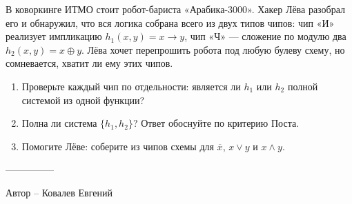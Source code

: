 \question
В коворкинге ИТМО стоит робот-бариста «Арабика-3000». Хакер Лёва разобрал его и обнаружил, что вся логика собрана всего из двух типов чипов: чип «И» реализует импликацию $h_1(x, y) = x \to y$, чип «Ч» — сложение по модулю два $h_2(x, y) = x \oplus y$. Лёва хочет перепрошить робота под любую булеву схему, но сомневается, хватит ли ему этих чипов.

\begin{enumerate}
    \item Проверьте каждый чип по отдельности: является ли $h_1$ или $h_2$ полной системой из одной функции?
    \item Полна ли система $\{h_1, h_2\}$? Ответ обоснуйте по критерию Поста.
    \item Помогите Лёве: соберите из чипов схемы для $\overline{x}$, $x \lor y$ и $x \land y$.
\end{enumerate}

---------------

Автор -- Ковалев Евгений